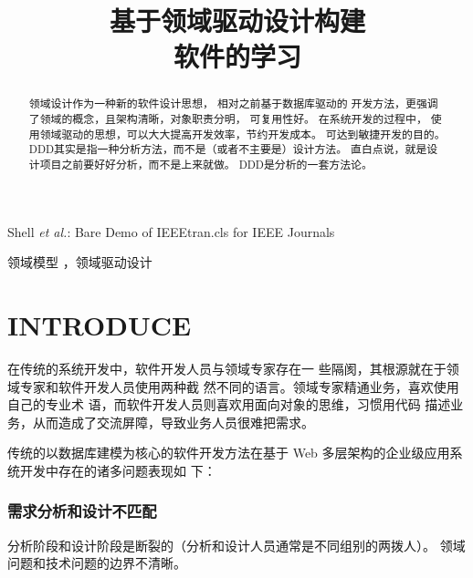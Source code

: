 \documentclass[journal]{IEEEtran}
\begin{document}
\begin{CJK*}{UTF8}{gbsn}


\title{基于领域驱动设计构建\\软件的学习}


%
%

\markboth{ }
{Shell \MakeLowercase{\textit{et al.}}: Bare Demo of IEEEtran.cls for IEEE Journals}


\maketitle



\begin{abstract} 
  领域设计作为一种新的软件设计思想， 相对之前基于数据库驱动的
  开发方法，更强调了领域的概念，且架构清晰，对象职责分明， 可复用性好。 
  在系统开发的过程中，
  使用领域驱动的思想，可以大大提高开发效率，节约开发成本。
  可达到敏捷开发的目的。
  DDD其实是指一种分析方法，而不是（或者不主要是）设计方法。
  直白点说，就是设计项目之前要好好分析，而不是上来就做。
  DDD是分析的一套方法论。  
\end{abstract}


\begin{IEEEkeywords} 
  领域模型 ，领域驱动设计
\end{IEEEkeywords}



\IEEEpeerreviewmaketitle



\section{INTRODUCE}
 
在传统的系统开发中，软件开发人员与领域专家存在一
些隔阂，其根源就在于领域专家和软件开发人员使用两种截
然不同的语言。领域专家精通业务，喜欢使用自己的专业术
语，而软件开发人员则喜欢用面向对象的思维，习惯用代码
描述业务，从而造成了交流屏障，导致业务人员很难把需求。

传统的以数据库建模为核心的软件开发方法在基于 Web
多层架构的企业级应用系统开发中存在的诸多问题表现如
下：

\subsubsection {需求分析和设计不匹配}
分析阶段和设计阶段是断裂的（分析和设计人员通常是不同组别的两拨人）。
领域问题和技术问题的边界不清晰。
 

\end{CJK*}
\end{document}
